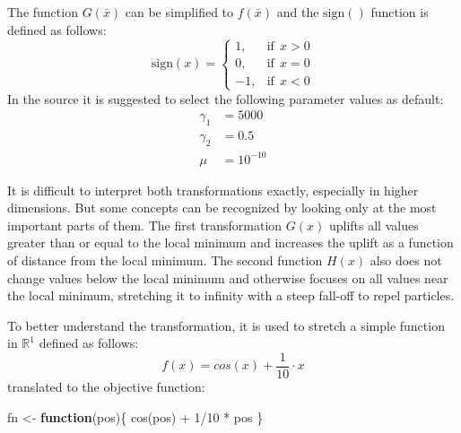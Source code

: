 \documentclass[
  oneside]{book}
\newenvironment{Shaded}{\begin{snugshade}}{\end{snugshade}}
\newcommand{\ControlFlowTok}[1]{\textcolor[rgb]{0.13,0.29,0.53}{\textbf{#1}}}
\newcommand{\DecValTok}[1]{\textcolor[rgb]{0.00,0.00,0.81}{#1}}
\newcommand{\FunctionTok}[1]{\textcolor[rgb]{0.00,0.00,0.00}{#1}}
\newcommand{\NormalTok}[1]{#1}
\newcommand{\OtherTok}[1]{\textcolor[rgb]{0.56,0.35,0.01}{#1}}
\newcommand{\SpecialCharTok}[1]{\textcolor[rgb]{0.00,0.00,0.00}{#1}}
\begin{document}
The function \(G(\bar{x})\) can be simplified to \(f(\bar{x})\) and the \(\text{sign}()\) function is defined as follows:
\[
  \text{sign}(x) = 
  \begin{cases}
    1, & \text{if}\ \ x > 0\\
    0, & \text{if}\ \ x = 0\\
    -1, & \text{if}\ \ x < 0
  \end{cases}
\]
In the source it is suggested to select the following parameter values as default:
\begin{align*}
  \gamma_1 &= 5000 \\
  \gamma_2 &= 0.5 \\
  \mu &= 10^{-10}
\end{align*}

It is difficult to interpret both transformations exactly, especially in higher dimensions. But some concepts can be recognized by looking only at the most important parts of them. The first transformation \(G(x)\) uplifts all values greater than or equal to the local minimum and increases the uplift as a function of distance from the local minimum. The second function \(H(x)\) also does not change values below the local minimum and otherwise focuses on all values near the local minimum, stretching it to infinity with a steep fall-off to repel particles.

To better understand the transformation, it is used to stretch a simple function in \(\mathbb{R}^1\) defined as follows:
\[
f(x) = cos(x)+\frac{1}{10}\cdot x
\]
translated to the objective function:

\begin{Shaded}
\begin{Highlighting}[]
\NormalTok{fn }\OtherTok{\textless{}{-}} \ControlFlowTok{function}\NormalTok{(pos)\{}
  \FunctionTok{cos}\NormalTok{(pos) }\SpecialCharTok{+} \DecValTok{1}\SpecialCharTok{/}\DecValTok{10} \SpecialCharTok{*}\NormalTok{ pos}
\NormalTok{\}}
\end{Highlighting}
\end{Shaded}
\end{document}
